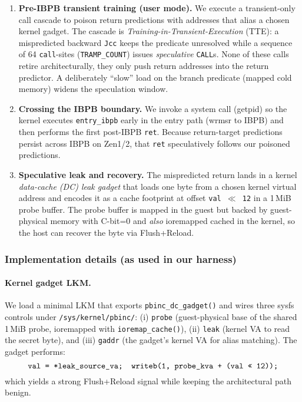\documentclass[11pt,a4paper]{article}
\begin{document}
\begin{enumerate}
  \item \textbf{Pre-IBPB transient training (user mode).} We execute a transient-only call cascade to poison return predictions with addresses that alias a chosen kernel gadget. The cascade is \emph{Training-in-Transient-Execution} (TTE): a mispredicted backward \texttt{Jcc} keeps the predicate unresolved while a sequence of 64 \texttt{call}-sites (\texttt{TRAMP\_COUNT}) issues \emph{speculative} \texttt{CALL}s. None of these calls retire architecturally, they only push return addresses into the return predictor. A deliberately ``slow'' load on the branch predicate (mapped cold memory) widens the speculation window.
  \item \textbf{Crossing the IBPB boundary.} We invoke a system call (getpid) so the kernel executes \texttt{entry\_ibpb} early in the entry path (wrmsr to IBPB) and then performs the first post-IBPB \texttt{ret}. Because return-target predictions persist across IBPB on Zen1/2, that \texttt{ret} speculatively follows our poisoned predictions.
  \item \textbf{Speculative leak and recovery.} The mispredicted return lands in a kernel \emph{data-cache (DC) leak gadget} that loads one byte from a chosen kernel virtual address and encodes it as a cache footprint at offset \texttt{val\,$\ll$\,12} in a 1\,MiB probe buffer. The probe buffer is mapped in the guest but backed by guest-physical memory with C-bit=0 and \emph{also} ioremapped cached in the kernel, so the host can recover the byte via Flush+Reload.
\end{enumerate}

\subsubsection{Implementation details (as used in our harness)}
\label{sec:method:pb-inception:impl}

\paragraph{Kernel gadget LKM.}
We load a minimal LKM that exports \texttt{pbinc\_dc\_gadget()} and wires three sysfs controls under \texttt{/sys/kernel/pbinc/}: (i) \texttt{probe} (guest-physical base of the shared 1\,MiB probe, ioremapped with \texttt{ioremap\_cache()}), (ii) \texttt{leak} (kernel VA to read the secret byte), and (iii) \texttt{gaddr} (the gadget's kernel VA for alias matching). The gadget performs:
\[
\text{\texttt{val = *leak\_source\_va;\quad writeb(1, probe\_kva + (val << 12));}}
\]
which yields a strong Flush+Reload signal while keeping the architectural path benign.
\end{document}
